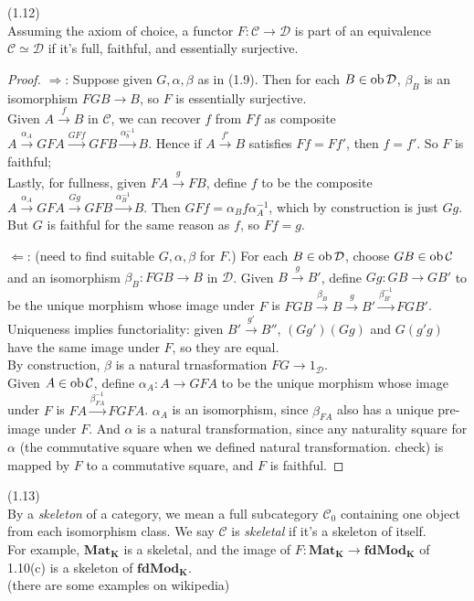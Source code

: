 \documentclass[a4paper]{article}
\begin{document}
\begin{lemma} (1.12)\\
    Assuming the axiom of choice, a functor $F:\mathcal{C} \to \mathcal{D}$ is part of an equivalence $\mathcal{C} \simeq \mathcal{D}$ if it's full, faithful, and essentially surjective.
    \begin{proof}
        $\Rightarrow$: Suppose given $G,\alpha,\beta$ as in (1.9). Then for each $B \in \operatorname{ob}\mathcal{D}$, $\beta_B$ is an isomorphism $FGB \to B$, so $F$ is essentially surjective.\\
        Given $A \xrightarrow{f} B$ in $\mathcal{C}$, we can recover $f$ from $Ff$ as composite $A \xrightarrow{\alpha_A} GFA \xrightarrow{GFf} GFB \xrightarrow{\alpha_b^{-1}} B$. Hence if $A \xrightarrow{f'}B$ satisfies $Ff = Ff'$, then $f=f'$. So $F$ is faithful;\\
        Lastly, for fullness, given $FA \xrightarrow{g} FB$, define $f$ to be the composite $A \xrightarrow {\alpha_A} GFA \xrightarrow{Gg} GFB \xrightarrow{\alpha_B^{-1}} B$. Then $GFf = \alpha_B f \alpha_A^{-1}$, which by construction is just $Gg$. But $G$ is faithful for the same reason as $f$, so $Ff = g$.

        $\Leftarrow$: (need to find suitable $G,\alpha,\beta$ for $F$.) For each $B \in \operatorname{ob} \mathcal{D}$, choose $GB \in \operatorname{ob} \mathcal{C}$ and an isomorphism $\beta_B : FGB \to B$ in $\mathcal{D}$. Given $B \xrightarrow{g} B'$, define $Gg:GB \to GB'$ to be the unique morphism whose image under $F$ is $FGB \xrightarrow{\beta_B} B \xrightarrow{g} B' \xrightarrow{\beta_{B'}^{-1}} FGB'$.\\
        Uniqueness implies functoriality: given $B' \xrightarrow{g'} B''$, $(Gg')(Gg)$ and $G(g'g)$ have the same image under $F$, so they are equal.\\
        By construction, $\beta$ is a natural trnasformation $FG \to 1_\mathcal{D}$.\\
        Given $A \in \operatorname{ob} \mathcal{C}$, define $\alpha_A: A \to GFA$ to be the unique morphism whose image under $F$ is $FA \xrightarrow{\beta_{FA}^{-1}} FGFA$. $\alpha_A$ is an isomorphism, since $\beta_{FA}$ also has a unique pre-image under $F$. And $\alpha$ is a natural transformation, since any naturality square for $\alpha$ (the commutative square when we defined natural transformation. check) is mapped by $F$ to a commutative square, and $F$ is faithful.
    \end{proof}
\end{lemma}

\begin{defi} (1.13) \\
    By a \emph{skeleton} of a category, we mean a full subcategory $\mathcal{C}_0$ containing one object from each isomorphism class. We say $\mathcal{C}$ is \emph{skeletal} if it's a skeleton of itself.\\
    For example, $\mathbf{Mat_K}$ is a skeletal, and the image of $F:\mathbf{Mat_K} \to \mathbf{fdMod_K}$ of 1.10(c) is a skeleton of $\mathbf{fdMod_K}$.\\
    (there are some examples on wikipedia)
\end{defi}
\end{document}
